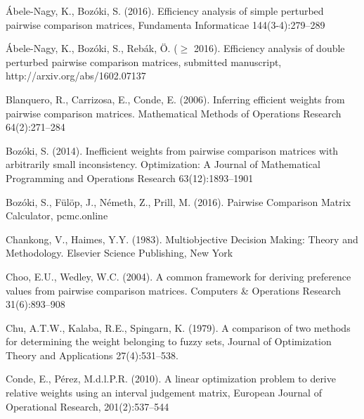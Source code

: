 \documentclass{article}
\theoremstyle{plain}
\begin{document}
\begin{thebibliography}{99}
\'Abele-Nagy, K., Boz\'oki, S. (2016). Ef{\kern0pt}f{\kern0pt}iciency
analysis of simple perturbed pairwise comparison matrices,
Fundamenta Informaticae 144(3-4):279--289

\'Abele-Nagy, K., Boz\'oki, S., Reb\'ak, \"O. ($\geq$ 2016).
Ef{\kern0pt}f{\kern0pt}iciency analysis of double perturbed
pairwise comparison matrices, submitted manuscript,
http://arxiv.org/abs/1602.07137

Blanquero, R., Carrizosa, E., Conde, E. (2006). Inferring
ef{\kern0pt}f{\kern0pt}icient weights from pairwise comparison
matrices. Mathematical Methods of Operations Research
64(2):271--284

Boz\'oki, S. (2014). Inef{\kern0pt}f{\kern0pt}icient weights from
pairwise comparison matrices with arbitrarily small inconsistency.
Optimization: A Journal of Mathematical Programming and Operations
Research 63(12):1893--1901

Boz\'oki, S., F\"ul\"op, J., N\'emeth, Z., Prill, M. (2016).
Pairwise Comparison Matrix Calculator,
pcmc.online

Chankong, V., Haimes, Y.Y. (1983).
Multiobjective Decision Making: Theory
and Methodology. Elsevier Science Publishing, New York

Choo, E.U., Wedley, W.C. (2004).
A common framework for deriving preference values from pairwise comparison matrices.
Computers \& Operations Research 31(6):893--908

Chu, A.T.W., Kalaba, R.E., Spingarn, K. (1979).
A comparison of two methods for determining the weight belonging to fuzzy sets,
{Journal of Optimization Theory and Applications}
27(4):531--538.

Conde, E., P\'erez, M.d.l.P.R. (2010).
A linear optimization problem to derive relative weights using an interval judgement matrix,
European Journal of Operational Research,
201(2):537--544



\end{thebibliography}
\end{document}
